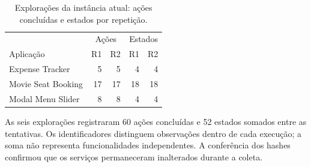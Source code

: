 \begin{table}[ht]
\centering
\caption{Explorações da instância atual: ações concluídas e estados por repetição.}
\label{tab:current}
\small
\begin{tabular}{lrrrr}
\toprule
 & \multicolumn{2}{c}{Ações} & \multicolumn{2}{c}{Estados}\\
Aplicação & R1 & R2 & R1 & R2\\
\midrule
Expense Tracker & 5 & 5 & 4 & 4\\
Movie Seat Booking & 17 & 17 & 18 & 18\\
Modal Menu Slider & 8 & 8 & 4 & 4\\
\bottomrule
\end{tabular}
\end{table}
As seis explorações registraram 60 ações concluídas e 52 estados somados entre as tentativas. Os identificadores distinguem observações dentro de cada execução; a soma não representa funcionalidades independentes. A conferência dos hashes confirmou que os serviços permaneceram inalterados durante a coleta.
